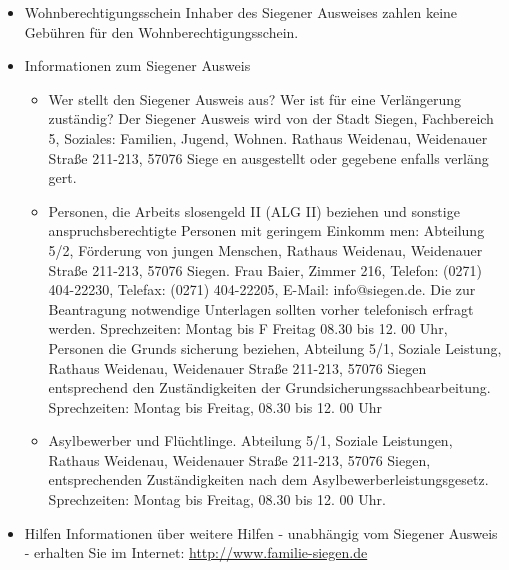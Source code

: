 \begin{itemize}
\begin{itemize}
	\end{itemize}
	\item Wohnberechtigungsschein Inhaber des Siegener Ausweises zahlen keine Gebühren für den Wohnberechtigungsschein.
	\item Informationen zum Siegener Ausweis
	\begin{itemize}
		\item Wer stellt den Siegener Ausweis aus? Wer ist für eine Verlängerung zuständig?	Der Siegener Ausweis wird von der 
		Stadt Siegen, Fachbereich 5, Soziales: Familien, Jugend, Wohnen. Rathaus Weidenau, Weidenauer Straße 211-213,  57076 Siege en ausgestellt oder gegebene enfalls verläng gert.  
		\item Personen, die Arbeits slosengeld II (ALG II) beziehen und sonstige anspruchsberechtigte Personen mit geringem Einkomm
		men: Abteilung 5/2, Förderung von jungen Menschen, Rathaus Weidenau, Weidenauer Straße 211-213, 57076 Siegen. Frau Baier, Zimmer 216, Telefon: (0271) 404-22230, Telefax: (0271) 404-22205, E-Mail: info@siegen.de. Die zur Beantragung notwendige Unterlagen sollten vorher telefonisch erfragt werden. Sprechzeiten: Montag bis F Freitag 08.30 bis 12. 00 Uhr, Personen  die Grunds sicherung beziehen,  Abteilung 5/1, Soziale Leistung, Rathaus Weidenau, Weidenauer Straße 211-213, 57076 Siegen  
		entsprechend den Zuständigkeiten der Grundsicherungssachbearbeitung. Sprechzeiten: Montag bis Freitag, 08.30 bis 12. 00 Uhr 
		\item Asylbewerber und Flüchtlinge. Abteilung 5/1, Soziale Leistungen, Rathaus Weidenau, Weidenauer Straße 211-213,	57076 Siegen, entsprechenden Zuständigkeiten nach dem Asylbewerberleistungsgesetz. Sprechzeiten: Montag bis Freitag, 08.30 bis 12. 00 Uhr.
	\end{itemize}
	\item Hilfen Informationen über weitere Hilfen - unabhängig vom Siegener Ausweis - erhalten Sie im Internet: \href{http://www.familie-siegen.de}{http://www.familie-siegen.de}
\end{itemize}